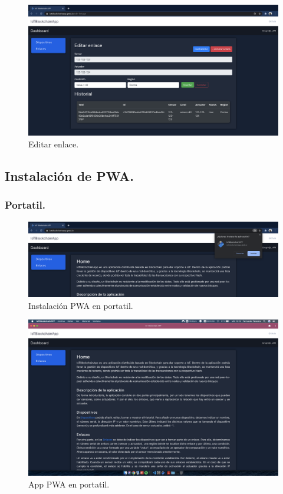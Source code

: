 \begin{figure}[h!]
  \centering
  \includegraphics[width=\textwidth]{imagenes/desarrollo/web/editar_enlace}
  \caption{Editar enlace.}
  \label{fig:editar-enlace}
\end{figure}

\subsection{Instalación de PWA.}

\subsubsection*{Portatil.}

\begin{figure}[h!]
 \centering
 \includegraphics[width=\textwidth]{imagenes/desarrollo/web/pwa/instalacion_pwa_portatil}
 \caption{Instalación PWA en portatil.}
 \label{fig:instalacion-pwa-portatil}
\end{figure}

\begin{figure}[t!]
  \centering
  \includegraphics[width=\textwidth]{imagenes/desarrollo/web/pwa/app_portatil}
  \caption{App PWA en portatil.}
  \label{fig:app-portatil}
\end{figure}

